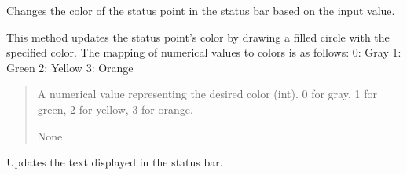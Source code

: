 \documentclass[letterpaper,10pt,english]{sphinxmanual}
\begin{document}
\begin{fulllineitems}

\begin{fulllineitems}
\label{\detokenize{StartStopHist:StartStopHist.StartStopLogic.changeColorThread}}
\pysigstartsignatures
{}
\pysigstopsignatures
\end{fulllineitems}


\begin{fulllineitems}
\label{\detokenize{StartStopHist:StartStopHist.StartStopLogic.changeStatusColor}}
\pysigstartsignatures
{}
\pysigstopsignatures
\sphinxAtStartPar
Changes the color of the status point in the status bar based on the input value.

\sphinxAtStartPar
This method updates the status point’s color by drawing a filled circle with the specified color.
The mapping of numerical values to colors is as follows:
\sphinxhyphen{} 0: Gray
\sphinxhyphen{} 1: Green
\sphinxhyphen{} 2: Yellow
\sphinxhyphen{} 3: Orange
\begin{quote}\begin{description}
\sphinxAtStartPar
{} \textendash{} A numerical value representing the desired color (int).
0 for gray, 1 for green, 2 for yellow, 3 for orange.

\sphinxAtStartPar
None

\end{description}\end{quote}

\end{fulllineitems}


\begin{fulllineitems}
\label{\detokenize{StartStopHist:StartStopHist.StartStopLogic.changeStatusThread}}
\pysigstartsignatures
{}
\pysigstopsignatures
\sphinxAtStartPar
Updates the text displayed in the status bar.


\end{fulllineitems}
\end{fulllineitems}
\end{document}
